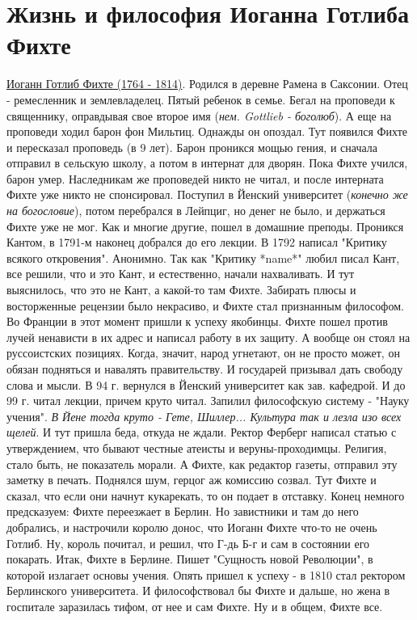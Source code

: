 \section{Жизнь и философия Иоганна Готлиба Фихте}
\underline{Иоганн Готлиб Фихте (1764 - 1814)}. Родился в деревне Рамена в Саксонии. Отец - ремесленник и землевладелец. Пятый ребенок в семье. Бегал на проповеди к священнику, оправдывая свое второе имя (\textit{нем. Gottlieb - боголюб}). А еще на проповеди ходил барон фон Мильтиц. Однажды он опоздал. Тут появился Фихте и пересказал проповедь (в 9 лет). Барон проникся мощью гения, и сначала отправил в сельскую школу, а потом в интернат для дворян. Пока Фихте учился, барон умер. Наследникам же проповедей никто не читал, и после интерната Фихте уже никто не спонсировал. Поступил в Йенский университет (\textit{конечно же на богословие}), потом перебрался в Лейпциг, но денег не было, и держаться Фихте уже не мог. Как и многие другие, пошел в домашние преподы. Проникся Кантом, в 1791-м наконец добрался до его лекции. В 1792 написал "Критику всякого откровения". Анонимно. Так как "Критику *name*" любил писал Кант, все решили, что и это Кант, и естественно, начали нахваливать. И тут выяснилось, что это не Кант, а какой-то там Фихте. Забирать плюсы и восторженные рецензии было некрасиво, и Фихте стал признанным философом. Во Франции в этот момент пришли к успеху якобинцы. Фихте пошел против лучей ненависти в их адрес и написал работу в их защиту. А вообще он стоял на руссоистских позициях. Когда, значит, народ угнетают, он не просто может, он обязан подняться и навалять правительству. И государей призывал дать свободу слова и мысли. В 94 г. вернулся в Йенский университет как зав. кафедрой. И  до 99 г. читал лекции, причем круто читал. Запилил философскую систему - "Науку учения". \textit{В Йене тогда круто - Гете, Шиллер... Культура так и лезла изо всех щелей}.
И тут пришла беда, откуда не ждали. Ректор Ферберг написал статью с утверждением, что бывают честные атеисты и веруны-проходимцы. Религия, стало быть, не показатель морали. А Фихте, как редактор газеты, отправил эту заметку в печать. Поднялся шум, герцог аж комиссию созвал. Тут Фихте и сказал, что если они начнут кукарекать, то он подает в отставку. Конец немного предсказуем: Фихте переезжает в Берлин. Но завистники и там до него добрались, и настрочили королю донос, что Иоганн Фихте что-то не очень Готлиб. Ну, король почитал, и решил, что Г-дь Б-г и сам в состоянии его покарать. Итак, Фихте в Берлине. Пишет "Сущность новой Революции", в которой излагает основы учения. Опять пришел к успеху - в 1810 стал ректором Берлинского университета. И философствовал бы Фихте и дальше, но жена в госпитале заразилась тифом, от нее и сам Фихте. Ну и в общем, Фихте все.

